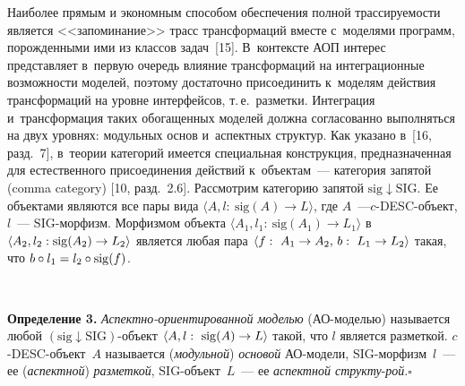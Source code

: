 \begin{multicols}{2}
 Наиболее прямым и экономным способом обеспечения полной
трассируемости является <<запомина\-ние>> трасс трансформаций вместе
с~{моделями} программ, порожденными ими из классов задач~[15]. В~контексте
АОП интерес представляет в~первую очередь влияние трансформаций на
интеграционные возможности моделей, поэтому достаточно присоединить
к~моделям действия трансформаций на уровне интерфейсов, т.\,е.\ разметки.
Интеграция и~трансформация таких обогащенных моделей должна
согласованно выполняться на двух уровнях: модульных основ и~аспектных
структур. Как указано в~[16, разд.~7], в~тео\-рии категорий имеется специальная
конструкция, предназначенная для естественного присоединения действий\linebreak
к~объектам~--- категория запятой (comma category) [10, разд.~2.6]. Рассмотрим
категорию запятой $\mathrm{sig} \downarrow \mathrm{SIG}$. Ее объектами являются все пары вида
$\langle A, l:\ \mathrm{sig}(A) \to L\rangle$, где $A$~---\linebreak $c$-DESC-объ\-ект, $l$~---
$\mathrm{SIG}$-мор\-физм. Морфизмом объекта $\langle A_1, l_1:\ \mathrm{sig}(A_1) \to L_1\rangle$ в
$\langle A_2, l_2: \mathrm{sig}(A_2) \hm\to L_2\rangle$ является любая пара $\langle f:\ A_1
\hm\to A_2,\, b:\ L_1 \hm\to L_2\rangle$ такая,
что $b \circ l_1 \hm= l_2 \circ \mathrm{sig}(f)$.

 \begin{center}
 \mbox{%
 \epsfxsize=60.469mm
 }
 \end{center}


\smallskip

\noindent
\textbf{Определение 3.} \textit{Аспектно-ориентированной моделью}
(АО-мо\-делью) называется любой $(\mathrm{sig} \downarrow \mathrm{SIG})$-объ\-ект
$\langle A, l:\ \mathrm{sig}(A) \hm\to L\rangle$ такой, что $l$ является разметкой.
 $c$-DESC-объ\-ект~$A$ называется (\textit{модульной}) \textit{основой}
АО-модели, $\mathrm{SIG}$-мор\-физм~$l$~--- ее (\textit{аспектной}) \textit{разметкой},
$\mathrm{SIG}$-объ\-ект~$L$~--- ее \textit{аспектной структу}-\linebreak \textit{рой}.\hfill$\square$



\end{multicols}
